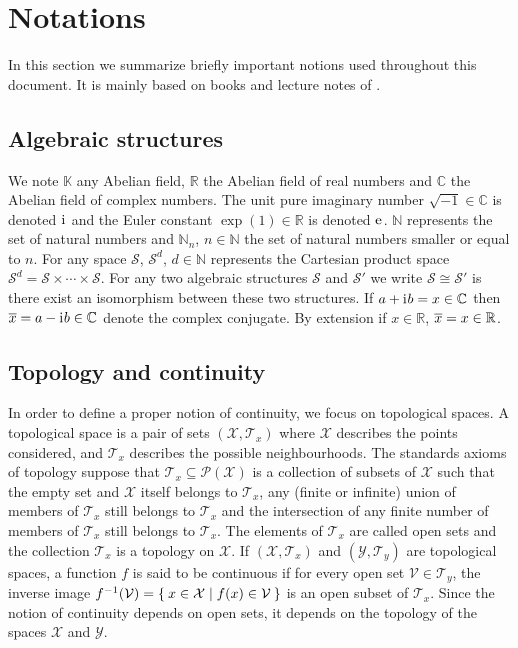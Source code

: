 
\section{Notations}
In this section we summarize briefly important notions used throughout this
document. It is mainly based on books and lecture notes of
\citet{kurdila2006convex,cotaescu2016elements}.

\subsection{Algebraic structures}
\label{sec:notations}
We note $\mathbb{K}$ any Abelian field, $\mathbb{R}$ the
Abelian field of real numbers and $\mathbb{C}$ the Abelian field of complex
numbers. The unit pure imaginary number $\sqrt{-1}\in\mathbb{C}$ is denoted
${\mathrm{i}\mkern1mu}$ and the Euler constant $\exp(1)\in\mathbb{R}$ is denoted $\mathrm{e}\mkern1mu$.
$\mathbb{N}$ represents the set of natural numbers and $\mathbb{N}_n$,
$n\in\mathbb{N}$ the set of natural numbers smaller or equal to $n$. For any
space $\mathcal{S}$, $\mathcal{S}^d$, $d\in\mathbb{N}$ represents the Cartesian
product space $\mathcal{S}^d = \mathcal{S}\times\cdots\times\mathcal{S}$. For
any two algebraic structures $\mathcal{S}$ and $\mathcal{S}'$ we write
$\mathcal{S}\cong\mathcal{S}'$ is there exist an isomorphism between these two
structures. If $a+{\mathrm{i}\mkern1mu} b = x \in \mathbb{C}$ then $\overline{x}=a-{\mathrm{i}\mkern1mu}
b\in\mathbb{C}$ denote the complex conjugate. By extension if $x\in\mathbb{R}$,
$\overline{x}=x\in\mathbb{R}$.

\subsection{Topology and continuity}
In order to define a proper notion of continuity, we focus on topological
spaces. A topological space is a pair of sets $(\mathcal{X},\mathcal{T}_x)$
where $\mathcal{X}$ describes the points considered, and $\mathcal{T}_x$
describes the possible neighbourhoods. The standards axioms of topology suppose
that $\mathcal{T}_x\subseteq{\mathcal{P}(\mathcal{X})}$ is a collection of
subsets of $\mathcal{X}$ such that the empty set and $\mathcal{X}$ itself
belongs to $\mathcal{T}_x$, any (finite or infinite) union of members of
$\mathcal{T}_x$ still belongs to $\mathcal{T}_x$ and the intersection of any
finite number of members of $\mathcal{T}_x$ still belongs to $\mathcal{T}_x$.
The elements of $\mathcal{T}_x$ are called open sets and the collection
$\mathcal{T}_x$ is a topology on $\mathcal{X}$. If
$(\mathcal{X},\mathcal{T}_x)$ and $(\mathcal{Y},\mathcal{T}_y)$ are topological
spaces, a function $f$ is said to be continuous if for every open set
$\mathcal{V}\in \mathcal{T}_y$, the inverse image $f^{-1}(\mathcal{V}) = \Set{
x \in \mathcal{X} | f ( x ) \in \mathcal{V} }$ is an open subset of
$\mathcal{T}_x$. Since the notion of continuity depends on open sets, it
depends on the topology of the spaces $\mathcal{X}$ and $\mathcal{Y}$.
